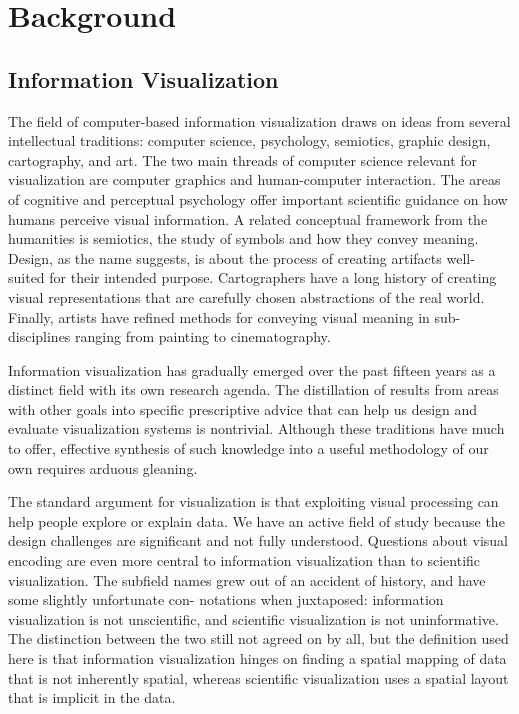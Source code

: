 \section{Background}
\label{sec:background}


\subsection{Information Visualization}
\label{sec:infovis}

The field of computer-based information visualization draws on ideas from several intellectual traditions: computer science, psychology, semiotics, graphic design, cartography, and art. The two main threads of computer science relevant for visualization are computer graphics and human-computer interaction. The areas of cognitive and perceptual psychology offer important scientific guidance on how humans perceive visual information. A related conceptual framework from the humanities is semiotics, the study of symbols and how they convey meaning. Design, as the name suggests, is about the process of creating artifacts well- suited for their intended purpose. Cartographers have a long history of creating visual representations that are carefully chosen abstractions of the real world. Finally, artists have refined methods for conveying visual meaning in sub-disciplines ranging from painting to cinematography.

Information visualization has gradually emerged over the past fifteen years as a distinct field with its own research agenda. The distillation of results from areas with other goals into specific prescriptive advice that can help us design and evaluate visualization systems is nontrivial. Although these traditions have much to offer, effective synthesis of such knowledge into a useful methodology of our own requires arduous gleaning.

The standard argument for visualization is that exploiting visual processing can help people explore or explain data. We have an active field of study because the design challenges are significant and not fully understood. Questions about visual encoding are even more central to information visualization than to scientific visualization. The subfield names grew out of an accident of history, and have some slightly unfortunate con- notations when juxtaposed: information visualization is not unscientific, and scientific visualization is not uninformative. The distinction between the two still not agreed on by all, but the definition used here is that information visualization hinges on finding a spatial mapping of data that is not inherently spatial, whereas scientific visualization uses a spatial layout that is implicit in the data.

